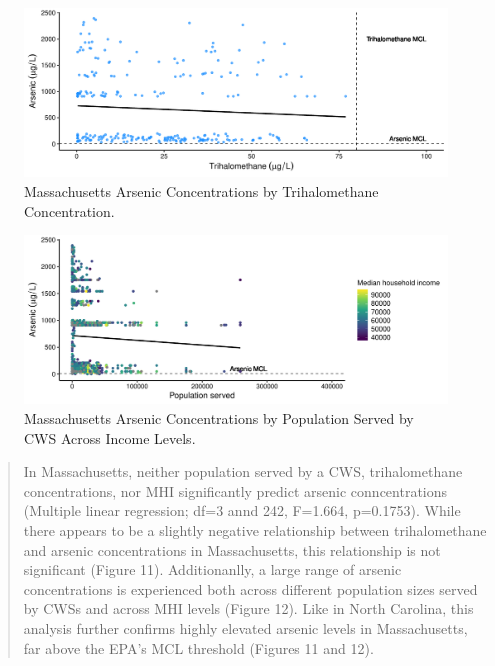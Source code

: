 \documentclass[12pt,]{article}
\begin{document}
\newpage

\begin{figure}
\centering
\includegraphics{Project_Template_files/figure-latex/figs11-1.pdf}
\caption{Massachusetts Arsenic Concentrations by Trihalomethane
Concentration.}
\end{figure}

\begin{figure}
\centering
\includegraphics{Project_Template_files/figure-latex/figs12-1.pdf}
\caption{Massachusetts Arsenic Concentrations by Population Served by
CWS Across Income Levels.}
\end{figure}

\begin{quote}
In Massachusetts, neither population served by a CWS, trihalomethane
concentrations, nor MHI significantly predict arsenic conncentrations
(Multiple linear regression; df=3 annd 242, F=1.664, p=0.1753). While
there appears to be a slightly negative relationship between
trihalomethane and arsenic concentrations in Massachusetts, this
relationship is not significant (Figure 11). Additionanlly, a large
range of arsenic concentrations is experienced both across different
population sizes served by CWSs and across MHI levels (Figure 12). Like
in North Carolina, this analysis further confirms highly elevated
arsenic levels in Massachusetts, far above the EPA's MCL threshold
(Figures 11 and 12).
\end{quote}

\newpage
\end{document}
